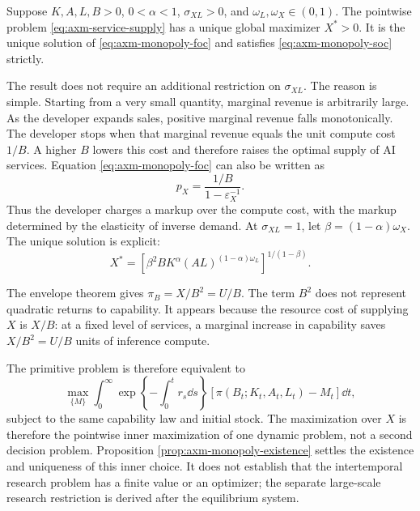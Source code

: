 \begin{proposition}
\label{prop:axm-monopoly-existence}
Suppose \(K,A,L,B>0\), \(0<\alpha<1\), \(\sigma_{XL}>0\), and
\(\omega_L,\omega_X\in(0,1)\). The pointwise problem
\eqref{eq:axm-service-supply} has a unique global maximizer \(X^*>0\). It is the
unique solution of \eqref{eq:axm-monopoly-foc} and satisfies
\eqref{eq:axm-monopoly-soc} strictly.
\end{proposition}

The result does not require an additional restriction on \(\sigma_{XL}\). The
reason is simple. Starting from a very small quantity, marginal revenue is
arbitrarily large. As the developer expands sales, positive marginal revenue
falls monotonically. The developer stops when that marginal revenue equals the
unit compute cost \(1/B\). A higher \(B\) lowers this cost and therefore raises
the optimal supply of AI services. Equation \eqref{eq:axm-monopoly-foc} can also
be written as
\begin{equation}
 p_X=\frac{1/B}{1-\varepsilon_X^{-1}}.
 \label{eq:axm-monopoly-markup}
\end{equation}
Thus the developer charges a markup over the compute cost, with the markup
determined by the elasticity of inverse demand. At \(\sigma_{XL}=1\), let
\(\beta=(1-\alpha)\omega_X\). The unique solution is explicit:
\begin{equation}
 X^*=\left[\beta^2B K^\alpha
 (AL)^{(1-\alpha)\omega_L}\right]^{1/(1-\beta)}.
 \label{eq:axm-monopoly-cd-solution}
\end{equation}

The envelope theorem gives \(\pi_B=X/B^2=U/B\). The term \(B^2\) does not
represent quadratic returns to capability. It appears because the resource cost
of supplying \(X\) is \(X/B\): at a fixed level of services, a marginal increase
in capability saves \(X/B^2=U/B\) units of inference compute.

The primitive problem is therefore equivalent to
\begin{equation}
 \max_{\{M\}}
 \int_0^\infty
 \exp\left\{-\int_0^t r_s\dd s\right\}
 \left[\pi(B_t;K_t,A_t,L_t)-M_t\right]\dd t,
 \label{eq:axm-developer-problem-reduced-benchmark}
\end{equation}
subject to the same capability law and initial stock. The maximization over
\(X\) is therefore the pointwise inner maximization of one dynamic problem, not
a second decision problem. Proposition \ref{prop:axm-monopoly-existence} settles
the existence and uniqueness of this inner choice. It does not establish that
the intertemporal research problem has a finite value or an optimizer; the
separate large-scale research restriction is derived after the equilibrium
system.

